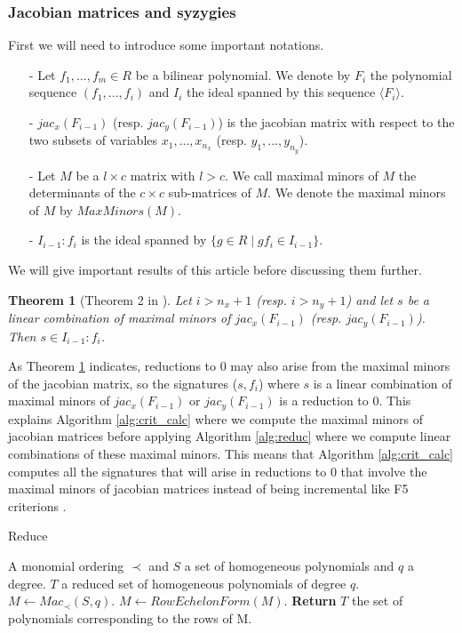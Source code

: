 \documentclass[english]{article}
\newtheorem{theorem}{Theorem}[section]
\begin{document}
		\subsubsection{Jacobian matrices and syzygies}
		First we will need to introduce some important notations.
		\begin{itemize}
			\item[-] Let $f_1,...,f_m \in R$ be a bilinear polynomial. We denote by $F_i$ the polynomial sequence $(f_1,...,f_i)$ and $I_i$ the ideal spanned by this sequence $\langle F_i \rangle$.
			\item[-] $jac_{x}(F_{i-1})$ (resp. $jac_{y}(F_{i-1})$) is the jacobian matrix with respect to the two subsets of variables $x_1,...,x_{n_x}$ (resp. $y_1,...,y_{n_y}$).
			\item[-] Let $M$ be a $l \times c$ matrix with $l > c$. We call maximal minors of $M$ the determinants of the $c \times c$ sub-matrices of $M$. We denote the maximal minors of $M$ by $MaxMinors(M)$.
			\item[-] $I_{i-1} : f_i$ is the ideal spanned by $\{g \in R \mid gf_i \in I_{i-1}\}$.
		\end{itemize}
		We will give important results of this article before discussing them further.
		
		\begin{theorem}[Theorem 2 in \cite{FSS11}]\label{theoremMaxMin}
			Let $i > n_x + 1$ (resp. $i > n_y + 1$) and let $s$ be a linear combination of maximal minors of $jac_{x}(F_{i-1})$ (resp. $jac_{y}(F_{i-1})$). Then $s \in I_{i-1} : f_i$.
		\end{theorem}
		
		As Theorem \ref{theoremMaxMin} indicates, reductions to 0 may also arise from the maximal minors of the jacobian matrix, so the signatures ($s, f_i$) where $s$ is a linear combination of maximal minors of $jac_{x}(F_{i-1})$ or $jac_{y}(F_{i-1})$ is a reduction to 0.
		This explains Algorithm \ref{alg:crit_calc} where we compute the maximal minors of jacobian matrices before applying Algorithm \ref{alg:reduc} where we compute linear combinations of these maximal minors.
		This means that Algorithm \ref{alg:crit_calc} computes all the signatures that will arise in reductions to 0 that involve the maximal minors of jacobian matrices instead of being incremental like F5 criterions \cite{F02}.
					
		\begin{algorithm}
			\caption{Reduce}\label{alg:reduc}
			\begin{algorithmic}[1]
				\Require A monomial ordering $\prec$ and $S$ a set of homogeneous polynomials and $q$ a degree.
				\Ensure $T$ a reduced set of homogeneous polynomials of degree $q$.
				\State $M \gets Mac_{\prec}(S, q)$.
				\State $M \gets RowEchelonForm(M)$.
				\State \textbf{Return} $T$ the set of polynomials corresponding to the rows of M.
			\end{algorithmic}
		\end{algorithm}
		
\end{document}
